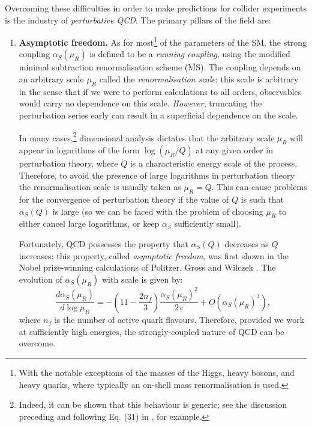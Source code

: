 \documentclass[withindex,glossary]{cam-thesis}
\begin{document}
Overcoming these difficulties in order to make predictions for collider experiments is the industry of \textit{perturbative QCD}. The primary pillars of the field are:
\begin{enumerate}[label = (\arabic*)]
\item \textbf{Asymptotic freedom.} As for most\footnote{With the notable exceptions of the masses of the Higgs, heavy bosons, and heavy quarks, where typically an on-shell mass renormalisation is used.} of the parameters of the SM, the strong coupling $\alpha_S(\mu_R)$ is defined to be a \textit{running coupling}, using the modified minimal subtraction renormalisation scheme ($\overline{\text{MS}}$). The coupling depends on an arbitrary scale $\mu_R$ called the \textit{renormalisation scale}; this scale is arbitrary in the sense that if we were to perform calculations to all orders, observables would carry no dependence on this scale. \textit{However}, truncating the perturbation series early can result in a superficial dependence on the scale. 

In many cases,\footnote{Indeed, it can be shown that this behaviour is generic; see the discussion preceding and following Eq. (31) in \cite{Delamotte:2002vw}, for example.} dimensional analysis dictates that the arbitrary scale $\mu_R$ will appear in logarithms of the form $\log(\mu_R / Q)$ at any given order in perturbation theory, where $Q$ is a characteristic energy scale of the process. Therefore, to avoid the presence of large logarithms in perturbation theory the renormalisation scale is usually taken as $\mu_R = Q$. This can cause problems for the convergence of perturbation theory if the value of $Q$ is such that $\alpha_S(Q)$ is large (so we can be faced with the problem of choosing $\mu_R$ to either cancel large logarithms, or keep $\alpha_S$ sufficiently small).

Fortunately, QCD possesses the property that $\alpha_S(Q)$ decreases as $Q$ increases; this property, called \textit{asymptotic freedom}, was first shown in the Nobel prize-winning calculations of Politzer, Gross and Wilczek \cite{Gross:1973id, Politzer:1973fx}. The evolution of $\alpha_S(\mu_R)$ with scale is given by: 
\begin{equation}
\label{eq:alphaSrunning}
\frac{d \alpha_S(\mu_R)}{d\log \mu_R} = - \left( 11 - \frac{2n_f}{3} \right) \frac{\alpha_S(\mu_R)^2}{2\pi} + O(\alpha_S(\mu_R)^3), 
\end{equation}
where $n_f$ is the number of active quark flavours. Therefore, provided we work at sufficiently high energies, the strongly-coupled nature of QCD can be overcome.


\end{enumerate}
\end{document}
